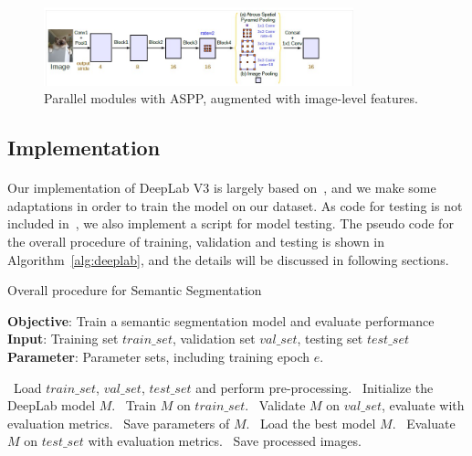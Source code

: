 \begin{figure}
    \centering
    \includegraphics[width=0.8\textwidth]{Section3/aspp.jpg}
    \caption{Parallel modules with ASPP, augmented with image-level features.}
    \label{fig:aspp}
\end{figure}

\subsection{Implementation}
\paragraph{}
Our implementation of DeepLab V3 is largely based on~\cite{Deeplab}, and we make some adaptations in order to train the model on our dataset. As code for testing is not included in~\cite{Deeplab}, we also implement a script for model testing. The pseudo code for the overall procedure of training, validation and testing is shown in Algorithm~\ref{alg:deeplab}, and the details will be discussed in following sections.
\begin{algorithm}[!ht]
    \caption{Overall procedure for Semantic Segmentation}\label{alg:deeplab}
    \textbf{Objective}: Train a semantic segmentation model and evaluate performance\\
    \textbf{Input}: Training set $train\_set$, validation set $val\_set$, testing set $test\_set$\\
    \textbf{Parameter}: Parameter sets, including training epoch $e$.
    \begin{algorithmic}[1]
        \STATE~Load $train\_set$, $val\_set$, $test\_set$ and perform pre-processing.
        \STATE~Initialize the DeepLab model $M$.
            \STATE~Train $M$ on $train\_set$.
            \STATE~Validate $M$ on $val\_set$, evaluate with evaluation metrics.
                \STATE~Save parameters of $M$. 
            \ENDIF{}
        \ENDFOR{}
        \STATE~Load the best model $M$.
        \STATE~Evaluate $M$ on $test\_set$ with evaluation metrics.
        \STATE~Save processed images.
    \end{algorithmic}
\end{algorithm}
